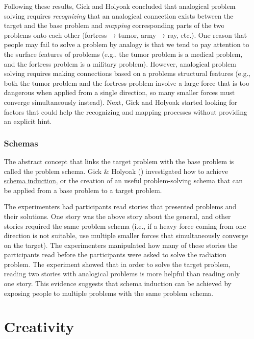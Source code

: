 \documentclass[
]{krantz}
\begin{document}
Following these results, Gick and Holyoak concluded that analogical problem solving requires
\emph{recognizing} that an analogical connection exists between the target and the base problem and \emph{mapping} corresponding parts of the two problems onto each other (fortress → tumor, army → ray, etc.). One reason that people may fail to solve a problem by analogy is that we tend to pay attention to the surface features of problems (e.g., the tumor problem is a medical problem, and the fortress problem is a military problem). However, analogical problem solving requires making connections based on a problems structural features (e.g., both the tumor problem and the fortress problem involve a large force that is too dangerous when applied from a single direction, so many smaller forces must converge simultaneously instead). Next, Gick and Holyoak started looking for factors that could help the recognizing and mapping processes without providing an explicit hint.

\subsubsection*{Schemas}\label{schemas}


The abstract concept that links the target problem with the base problem is called the problem schema. Gick \& Holyoak () investigated how to achieve \hyperref[schema-induction]{schema induction}, or the creation of an useful problem-solving schema that can be applied from a base problem to a target problem.

The experimenters had participants read stories that presented problems and their solutions. One story was the above story about the general, and other stories required the same problem schema (i.e., if a heavy force coming from one direction is not suitable, use multiple smaller forces that simultaneously converge on the target). The experimenters manipulated how many of these stories the participants read before the participants were asked to solve the radiation problem. The experiment showed that in order to solve the target problem, reading two stories with analogical problems is more helpful than reading only one story. This evidence suggests that schema induction can be achieved by exposing people to multiple problems with the same problem schema.

\section{Creativity}\label{creativity}
\end{document}
